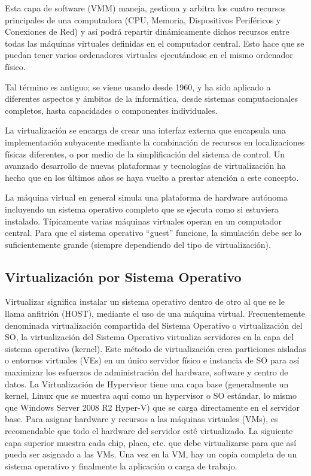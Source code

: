 \documentclass[12pt, twoside]{report}
\begin{document}
Esta capa de software (VMM) maneja, gestiona y arbitra los cuatro recursos principales de una computadora (CPU, Memoria, Dispositivos Periféricos y Conexiones de Red) y así podrá repartir dinámicamente dichos recursos entre todas las máquinas virtuales definidas en el computador central. Esto hace que se puedan tener varios ordenadores virtuales ejecutándose en el mismo ordenador físico.

Tal término es antiguo; se viene usando desde 1960, y ha sido aplicado a diferentes aspectos y ámbitos de la informática, desde sistemas computacionales completos, hasta capacidades o componentes individuales.

La virtualización se encarga de crear una interfaz externa que encapsula una implementación subyacente mediante la combinación de recursos en localizaciones físicas diferentes, o por medio de la simplificación del sistema de control. Un avanzado desarrollo de nuevas plataformas y tecnologías de virtualización ha hecho que en los últimos años se haya vuelto a prestar atención a este concepto.

La máquina virtual en general simula una plataforma de hardware autónoma incluyendo un sistema operativo completo que se ejecuta como si estuviera instalado. Típicamente varias máquinas virtuales operan en un computador central. Para que el sistema operativo ``guest'' funcione, la simulación debe ser lo suficientemente grande (siempre dependiendo del tipo de virtualización).

\subsection{Virtualización por Sistema Operativo}

Virtualizar significa instalar un sistema operativo dentro de otro al que se le llama anfitrión (HOST), mediante el uso de una máquina virtual. Frecuentemente denominada virtualización compartida del Sistema Operativo o virtualización del SO, la virtualización del Sistema Operativo virtualiza servidores en la capa del sistema operativo (kernel). Este método de virtualización crea particiones aisladas o entornos virtuales (VEs) en un único servidor físico e instancia de SO para así maximizar los esfuerzos de administración del hardware, software y centro de datos. La Virtualización de Hypervisor tiene una capa base (generalmente un kernel, Linux que se muestra aquí como un hypervisor o SO estándar, lo mismo que Windows Server 2008 R2 Hyper-V) que se carga directamente en el servidor base. Para asignar hardware y recursos a las máquinas virtuales (VMs), es recomendable que todo el hardware del servidor esté virtualizado. La siguiente capa superior muestra cada chip, placa, etc. que debe virtualizarse para que así pueda ser asignado a las VMs. Una vez en la VM, hay un copia completa de un sistema operativo y finalmente la aplicación o carga de trabajo.
\end{document}
